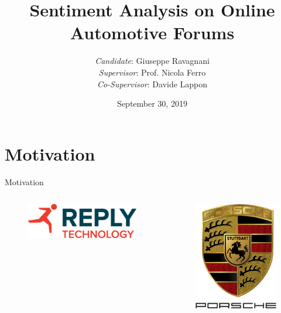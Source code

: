 \documentclass{beamer}
\title{Sentiment Analysis on Online Automotive Forums}
\author[me]{\vspace{5mm}\textit{Candidate}: Giuseppe Ravagnani\\\textit{Supervisor}: Prof. Nicola Ferro\\\textit{Co-Supervisor}: Davide Lappon\\[5mm]}
\date{September 30, 2019}
\begin{document}
	\maketitle



	\section{Motivation}
	
	\begin{frame}{Motivation}
		\begin{columns}
			\centering
			\begin{figure}
				\includegraphics[width=.9\linewidth]{figures/reply2.pdf}
			\end{figure}
			\centering
			\begin{figure}
				\includegraphics[width=.6\linewidth]{figures/porsche2.png}
			\end{figure}
		\end{columns}
	\end{frame}
	
\end{document}
